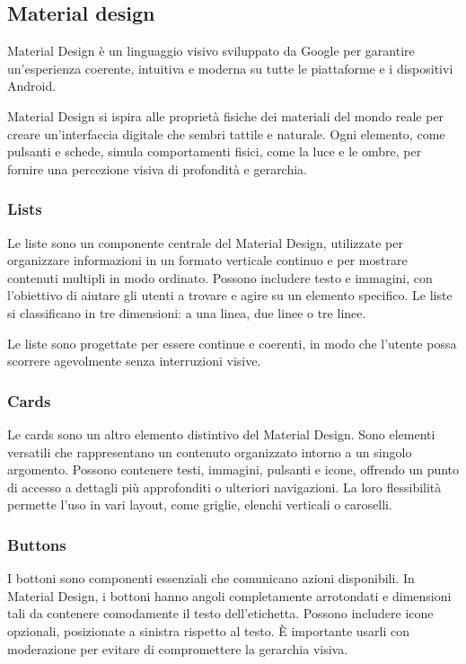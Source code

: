 \subsection{Material design}
Material Design è un linguaggio visivo sviluppato da Google per garantire un’esperienza coerente, intuitiva e moderna su tutte le piattaforme e i dispositivi Android.

Material Design si ispira alle proprietà fisiche dei materiali del mondo reale per creare un’interfaccia digitale che sembri tattile e naturale. Ogni elemento, come pulsanti e schede, simula comportamenti fisici, come la luce e le ombre, per fornire una percezione visiva di profondità e gerarchia.

\subsubsection{Lists}
Le liste sono un componente centrale del Material Design, utilizzate per organizzare informazioni in un formato verticale continuo e per mostrare contenuti multipli in modo ordinato. Possono includere testo e immagini, con l’obiettivo di aiutare gli utenti a trovare e agire su un elemento specifico. Le liste si classificano in tre dimensioni: a una linea, due linee o tre linee.

Le liste sono progettate per essere continue e coerenti, in modo che l'utente possa scorrere agevolmente senza interruzioni visive.

\subsubsection{Cards}
Le cards sono un altro elemento distintivo del Material Design.
Sono elementi versatili che rappresentano un contenuto organizzato intorno a un singolo argomento. Possono contenere testi, immagini, pulsanti e icone, offrendo un punto di accesso a dettagli più approfonditi o ulteriori navigazioni. La loro flessibilità permette l'uso in vari layout, come griglie, elenchi verticali o caroselli.

\subsubsection{Buttons}
I bottoni sono componenti essenziali che comunicano azioni disponibili. In Material Design, i bottoni hanno angoli completamente arrotondati e dimensioni tali da contenere comodamente il testo dell’etichetta. Possono includere icone opzionali, posizionate a sinistra rispetto al testo. È importante usarli con moderazione per evitare di compromettere la gerarchia visiva.

